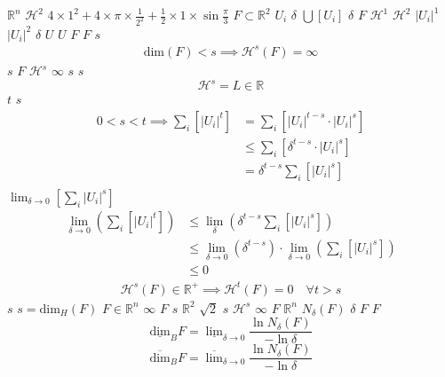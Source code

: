 \documentclass{article}
\begin{document}
$\mathbb{R}^n$
$\mathcal{H}^{2}$
$4\times 1^2 + 4\times \pi\times \frac{1}{2^2} + \frac{1}{2}\times 1 \times \sin{\frac{\pi}{3}}$
$F \subset \mathbb{R}^{2}$
$U_{i}$
$\delta$
$\bigcup \left[U_{i}\right]$
$\delta$
$F$
$\mathcal{H}^{1}$
$\mathcal{H}^{2}$
$\left\lvert U_i \right\rvert^1$
$\left\lvert U_i \right\rvert^2$
$\delta$
$U$
$U$
$F$
$F$
$s$
\begin{align}
\mathrm{dim}\left(  F \right ) < s \implies \mathcal{H}^{s} \left( F \right)  = \infty
\end{align}
$s$
$F$
$\mathcal{H}^s$
$\infty$
$s$
$s$
\[
\mathcal{H}^s = L \in \mathbb{R}
\]
$t$
$s$
\begin{align*}
0<s<t  \implies   \sum_{i}  \left[ \left\lvert U_i \right\rvert^t \right] &= \sum_{i}\left[ \left\lvert U_i \right\rvert^{t- s} \cdot  \left\lvert U_i \right\rvert^s \right] \\
&\leq \sum_{i} \left[ \delta^{t - s} \cdot \left\lvert U_i \right\rvert^s  \right]    \\
&= \delta^{t- s}\sum_{i}   \left[ \left\lvert U_i \right\rvert^s \right] 									   \\
\end{align*}
$\lim_{\delta \rightarrow 0}\left[ \sum_{i}   \left\lvert U_i \right\rvert^s \right]$
\begin{align}
    \lim_{\delta \rightarrow 0} \left( \sum_{i}   \left[ \left\lvert U_i \right\rvert^t \right]  \right) & \leq \lim_{\delta}\left( \delta^{t- s} \sum_{i}   \left[ \left\lvert U_i \right\rvert^s \right]  \right) \\
&\leq \lim_{\delta \rightarrow 0}\left( \delta^{t - s} \right) \cdot  \lim_{\delta \rightarrow 0}\left( \sum_{i} \left[ \left\lvert U_i \right\rvert^s \right]    \right) \\
&\leq 0
\end{align}
\begin{align}
    \mathcal{H}^{s} \left(F\right) \in \mathbb{R}^{+}  \implies  \mathcal{H}^t\left( F \right)= 0 \quad \forall t > s \label{eq:hdfzero}
\end{align}
$s$
$s = \mathrm{dim}_{H}\left( F \right)$
$F\in \mathbb{R}^{n}$
$\infty$
$F$
$s$
$\mathbb{R}^{2}$
$\sqrt{2}$
$s$
$\mathcal{H}^{s}$
$\infty$
$F$
$\mathbb{R}^n$
$N_\delta(F)$
$\delta$
$F$
$F$
\begin{equation*}
    \underline{\text{dim}}_BF = \underline{\lim}_{\delta \to 0} \frac{\ln N_\delta(F)}{-\ln \delta}
\end{equation*}
\begin{equation*}
\overline{\text{dim}}_BF = \overline{\lim}_{\delta \to 0} \frac{\ln N_\delta(F)}{-\ln \delta}
\end{equation*}
\end{document}
